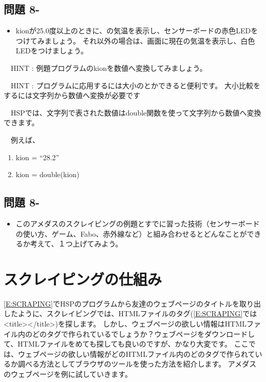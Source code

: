 \documentclass[a4paper,12pt,dvipdfmx]{jarticle}
\newcounter{Question}
\renewcommand\theQuestion{\textbf{問題 8-\arabic{Question}}}
\begin{document}
\subsection*{\theQuestion}
\begin{itemize}
\item
kionが25.0度以上のときに、の気温を表示し、センサーボードの赤色LEDをつけてみましょう。
		それ以外の場合は、画面に現在の気温を表示し、白色LEDをつけましょう。
\end{itemize}
\ \ HINT :
例題プログラムのkionを数値へ変換してみましょう。

\ \ HINT :
プログラムに応用するには大小のとかできると便利です。
大小比較をするには文字列から数値へ変換が必要です

\ \ HSPでは、文字列で表された数値はdouble関数を使って文字列から数値へ変換できます。

\ \ 例えば、



\begin{center}
\begin{boxedminipage}{8.326cm}
\begin{enumerate}
\baselineskip 10pt
\setlength{\itemsep}{0cm} %
\item kion = “28.2”
\item kion = double(kion)
\end{enumerate}
\end{boxedminipage}
\end{center}

\bigskip


\bigskip

\subsection*{\theQuestion}
\begin{itemize}
\item
このアメダスのスクレイピングの例題とすでに習った技術（センサーボードの使い方、ゲーム、Fabo、赤外線など）と組み合わせるとどんなことができるか考えて、１つ上げてみよう。
\end{itemize}

\bigskip


\bigskip

\clearpage\section{スクレイピングの仕組み}
\ref*{E:SCRAPING}でHSPのプログラムから友達のウェブページのタイトルを取り出したように、スクレイピングでは、HTMLファイルのタグ(\ref*{E:SCRAPING}では{\textless}title{\textgreater}{\textless}/title{\textgreater})を探します。
しかし、ウェブページの欲しい情報はHTMLファイル内のどのタグで作られているでしょうか？ウェブページをダウンロードして、HTMLファイルをめても探しても良いのですが、かなり大変です。
ここでは、ウェブページの欲しい情報がどのHTMLファイル内のどのタグで作られているか調べる方法としてブラウザのツールを使った方法を紹介します。
アメダスのウェブページを例に試していきます。
\end{document}
